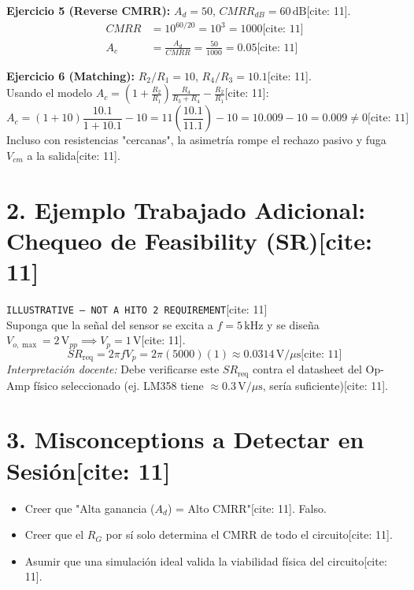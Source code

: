 \documentclass[11pt, a4paper]{article}
\begin{document}
\textbf{Ejercicio 5 (Reverse CMRR):} $A_d=50$, $CMRR_{dB}=60\,\text{dB}$[cite: 11].
\begin{align*}
    CMRR &= 10^{60/20} = 10^3 = 1000 \text{[cite: 11]} \\
    A_c &= \frac{A_d}{CMRR} = \frac{50}{1000} = \boxed{0.05} \text{[cite: 11]}
\end{align*}

\textbf{Ejercicio 6 (Matching):} $R_2/R_1 = 10$, $R_4/R_3 = 10.1$[cite: 11]. \\
Usando el modelo $A_c = \left(1+\frac{R_2}{R_1}\right)\frac{R_4}{R_3+R_4} - \frac{R_2}{R_1}$[cite: 11]:
\begin{equation*}
    A_c = (1+10)\frac{10.1}{1+10.1} - 10 = 11\left(\frac{10.1}{11.1}\right) - 10 = 10.009 - 10 = \boxed{0.009 \neq 0} \text{[cite: 11]}
\end{equation*}
Incluso con resistencias "cercanas", la asimetría rompe el rechazo pasivo y fuga $V_{cm}$ a la salida[cite: 11].

\section*{2. Ejemplo Trabajado Adicional: Chequeo de Feasibility (SR)[cite: 11]}
\texttt{ILLUSTRATIVE — NOT A HITO 2 REQUIREMENT}[cite: 11] \\
Suponga que la señal del sensor se excita a $f=5\,\text{kHz}$ y se diseña $V_{o,\max} = 2\,\text{V}_{pp} \implies V_p = 1\,\text{V}$[cite: 11].
\begin{equation*}
    SR_{\mathrm{req}} = 2\pi f V_p = 2\pi(5000)(1) \approx \boxed{0.0314\,\text{V}/\mu\text{s}} \text{[cite: 11]}
\end{equation*}
\textit{Interpretación docente:} Debe verificarse este $SR_{\mathrm{req}}$ contra el datasheet del Op-Amp físico seleccionado (ej. LM358 tiene $\approx 0.3\,\text{V}/\mu\text{s}$, sería suficiente)[cite: 11].

\section*{3. Misconceptions a Detectar en Sesión[cite: 11]}
\begin{itemize}
    \setlength{\itemsep}{0pt}
    \item Creer que "Alta ganancia ($A_d$) = Alto CMRR"[cite: 11]. Falso.
    \item Creer que el $R_G$ por sí solo determina el CMRR de todo el circuito[cite: 11].
    \item Asumir que una simulación ideal valida la viabilidad física del circuito[cite: 11].
\end{itemize}
\end{document}
